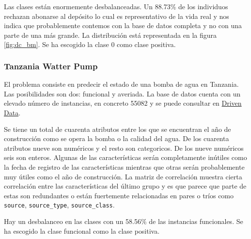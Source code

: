 \documentclass[..]{subfiles}
\begin{document}
Las clases están enormemente desbalanceadas. Un 88.73\% de los individuos rechazan abonarse al depósito lo cual es representativo de la vida real y nos indica que probablemente contemos con la base de datos completa y no con una parte de una más grande. La distribución está representada en la figura \ref{fig:dc_bm}. Se ha escogido la clase 0 como clase positiva.

\begin{figure}[h!]
	\centering
	   \hspace{1.0cm}
	   \caption{}
\end{figure}


\subsubsection{Tanzania Watter Pump}
El problema consiste en predecir el estado de una bomba de agua en Tanzania. Las posibilidades son dos: funcional y averiada. La base de datos cuenta con un elevado número de instancias, en concreto 55082 y se puede consultar en \hyperlink{https://www.drivendata.org/competitions/7/pump-it-up-data-mining-the-water-table}{Driven Data}.

Se tiene un total de cuarenta atributos entre los que se encuentran el año de construcción como se opera la bomba o la calidad del agua. De los cuarenta atributos nueve son numéricos y el resto son categoricos. De los nueve numéricos seis son enteros. Algunas de las características serán completamente inútiles como la fecha de registro de las características mientras que otras serán probablemente muy útiles como el año de construcción. La matriz de correlación muestra cierta correlación entre las características del último grupo y es que parece que parte de estas son redundantes o están fuertemente relacionadas en pares o tríos como \texttt{source}, \texttt{source\_type}, \texttt{source\_class}.

Hay un desbalanceo en las clases con un 58.56\% de las instancias funcionales. Se ha escogido la clase funcional como la clase positiva.

\begin{figure}[h!]
	\centering
	   \hspace{1.0cm}
	   \caption{}
\end{figure}
\end{document}
